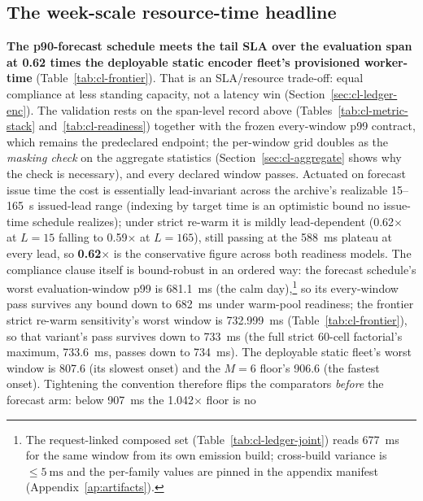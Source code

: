 \subsection{The week-scale resource-time headline}
\label{sec:cl-headline}

\textbf{The p90-forecast schedule meets the tail SLA over the evaluation
span at 0.62 times the deployable static encoder fleet's provisioned
worker-time} (Table~\ref{tab:cl-frontier}). That is an SLA/resource
trade-off: equal compliance at less standing capacity, not a latency win
(Section~\ref{sec:cl-ledger-enc}). The validation rests on the span-level
record above (Tables~\ref{tab:cl-metric-stack}
and~\ref{tab:cl-readiness}) together with the frozen every-window p99
contract, which remains the predeclared endpoint; the per-window grid
doubles as the \emph{masking check} on the aggregate statistics
(Section~\ref{sec:cl-aggregate} shows why the check is
necessary), and every declared window passes. Actuated on forecast issue time the cost is
essentially lead-invariant across the archive's realizable
15--\SI{165}{\second} issued-lead range (indexing by target time is an
optimistic bound no issue-time schedule realizes); under strict re-warm it is
mildly lead-dependent (0.62$\times$ at $L{=}15$ falling to 0.59$\times$ at
$L{=}165$), still passing at the \SI{588}{\milli\second} plateau at every lead,
so \textbf{0.62$\times$} is the conservative figure across both readiness
models. The compliance clause itself is bound-robust in an ordered way: the
forecast schedule's worst evaluation-window p99 is \num{681.1}~ms (the calm
day),\footnote{The request-linked composed set
(Table~\ref{tab:cl-ledger-joint}) reads \SI{677}{\milli\second} for the same
window from its own emission build; cross-build variance is
${\leq}\SI{5}{\milli\second}$ and the per-family values are pinned in the
appendix manifest (Appendix~\ref{ap:artifacts}).} so its every-window pass
survives any bound down to
\SI{682}{\milli\second} under warm-pool readiness; the frontier strict
re-warm sensitivity's worst window is \SI{732.999}{\milli\second}
(Table~\ref{tab:cl-frontier}), so that variant's pass survives down to
\SI{733}{\milli\second} (the full strict 60-cell factorial's maximum,
\SI{733.6}{\milli\second}, passes down to \SI{734}{\milli\second}). The deployable static fleet's worst window
is \num{807.6} (its slowest onset) and the $M{=}6$ floor's \num{906.6} (the fastest onset).
Tightening the convention therefore flips the comparators \emph{before} the
forecast arm: below \SI{907}{\milli\second} the 1.042$\times$ floor is no
